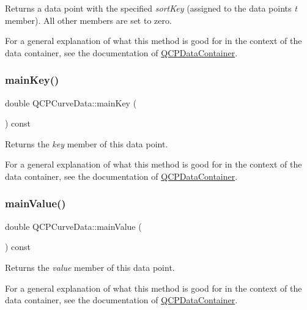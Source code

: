 Returns a data point with the specified {\itshape sort\+Key} (assigned to the data point\textquotesingle{}s {\itshape t} member). All other members are set to zero.

For a general explanation of what this method is good for in the context of the data container, see the documentation of \hyperlink{class_q_c_p_data_container}{Q\+C\+P\+Data\+Container}. \mbox{\label{class_q_c_p_curve_data_ac805ffc8b4207652efb9fcc6a2cdd3e8}} 
\subsubsection{\texorpdfstring{main\+Key()}{mainKey()}}
{\footnotesize\ttfamily double Q\+C\+P\+Curve\+Data\+::main\+Key (\begin{DoxyParamCaption}{ }\end{DoxyParamCaption}) const\hspace{0.3cm}{\ttfamily [inline]}}

Returns the {\itshape key} member of this data point.

For a general explanation of what this method is good for in the context of the data container, see the documentation of \hyperlink{class_q_c_p_data_container}{Q\+C\+P\+Data\+Container}. \mbox{\label{class_q_c_p_curve_data_a39a94131e5f62f16b256bcf8c47a3205}} 
\subsubsection{\texorpdfstring{main\+Value()}{mainValue()}}
{\footnotesize\ttfamily double Q\+C\+P\+Curve\+Data\+::main\+Value (\begin{DoxyParamCaption}{ }\end{DoxyParamCaption}) const\hspace{0.3cm}{\ttfamily [inline]}}

Returns the {\itshape value} member of this data point.

For a general explanation of what this method is good for in the context of the data container, see the documentation of \hyperlink{class_q_c_p_data_container}{Q\+C\+P\+Data\+Container}. \mbox{\label{class_q_c_p_curve_data_a583174f2b68e01b4d545f04571f58bd0}} 
